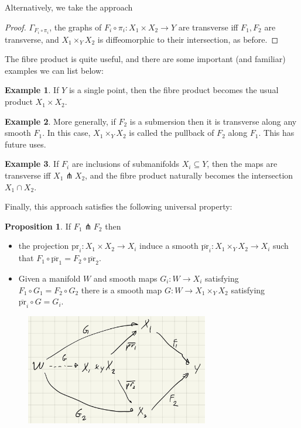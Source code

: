 \documentclass{article}
\theoremstyle{definition}
\newtheorem{proposition}{Proposition}
\newtheorem{example}{Example}
\begin{document}
Alternatively, we take the approach

\begin{proof}
  $\Gamma_{F_i \circ \pi_i}$, the graphs of $F_i \circ \pi_i : X_1 \times X_2
  \to Y$ are transverse iff $F_1, F_2$ are transverse, and $X_1 \times_Y X_2$ is
  diffeomorphic to their intersection, as before.
\end{proof}

The fibre product is quite useful, and there are some important (and familiar)
examples we can list below:

\begin{example}
  If $Y$ is a single point, then the fibre product becomes the usual product
  $X_1 \times X_2$.
\end{example}

\begin{example}
  More generally, if $F_2$ is a submersion then it is transverse along any
  smooth $F_1$. In this case, $X_1 \times_Y X_2$ is called the pullback of $F_2$
  along $F_1$. This has future uses.
\end{example}

\begin{example}
  If $F_i$ are inclusions of submanifolds $X_i \subseteq Y$, then the maps are
  transverse iff $X_1 \pitchfork X_2$, and the fibre product naturally becomes
  the intersection $X_1 \cap X_2$. 
\end{example}

Finally, this approach satisfies the following universal property:

\begin{proposition}
  If $F_1 \pitchfork F_2$ then
  \begin{itemize}
    \item the projection $\text{pr}_i : X_1 \times X_2 \to X_i$ induce a smooth
      $\overline{\text{pr}}_i : X_1 \times_Y X_2 \to X_i$ such that $F_1 \circ
      \overline{\text{pr}}_1 = F_2 \circ \overline{\text{pr}}_2$.
    \item Given a manifold $W$ and smooth maps $G_i : W \to X_i$ satisfying $F_1
      \circ G_1 = F_2 \circ G_2$ there is a smooth map $G : W \to X_1 \times_Y
      X_2$ satisfying $\overline{\text{pr}}_i \circ G = G_i$.
  \end{itemize}
\end{proposition}

\begin{figure}[H]
  \centering
  \includegraphics[width=8cm]{res/DG/DG12_universal_property.jpg}
  \label{figure: DG12_universal_property.jpg}
\end{figure}
\end{document}
